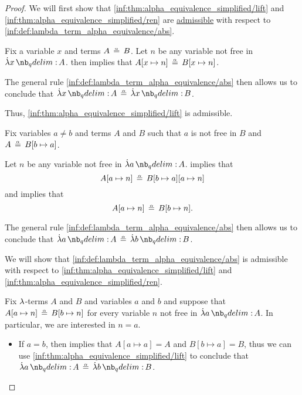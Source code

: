 \begin{proof}
  \SufficiencySubProof We will first show that \ref{inf:thm:alpha_equivalence_simplified/lift} and \ref{inf:thm:alpha_equivalence_simplified/ren} are \hyperref[con:inference_rule_admissibility]{admissible} with respect to \ref{inf:def:lambda_term_alpha_equivalence/abs}.

   Fix a variable \( x \) and terms \( A \aequiv B \). Let \( n \) be any variable not free in \( \qabs x A \).  then implies that \( A[x \mapsto n] \aequiv B[x \mapsto n] \).

  The general rule \ref{inf:def:lambda_term_alpha_equivalence/abs} then allows us to conclude that \( \qabs x A \aequiv \qabs x B \).

  Thus, \ref{inf:thm:alpha_equivalence_simplified/lift} is admissible.

   Fix variables \( a \neq b \) and terms \( A \) and \( B \) such that \( a \) is not free in \( B \) and \( A \aequiv B[b \mapsto a] \).

  Let \( n \) be any variable not free in \( \qabs a A \).  implies that
  \begin{equation*}
    A[a \mapsto n] \aequiv B[b \mapsto a][a \mapsto n]
  \end{equation*}
  and  implies that
  \begin{equation*}
    A[a \mapsto n] \aequiv B[b \mapsto n].
  \end{equation*}

  The general rule \ref{inf:def:lambda_term_alpha_equivalence/abs} then allows us to conclude that \( \qabs a A \aequiv \qabs b B \).

  \NecessitySubProof We will show that \ref{inf:def:lambda_term_alpha_equivalence/abs} is admissible with respect to \ref{inf:thm:alpha_equivalence_simplified/lift} and \ref{inf:thm:alpha_equivalence_simplified/ren}.

  Fix \( {\mathrm \lambda} \)-terms \( A \) and \( B \) and variables \( a \) and \( b \) and suppose that \( A[a \mapsto n] \aequiv B[b \mapsto n] \) for every variable \( n \) not free in \( \qabs a A \). In particular, we are interested in \( n = a \).

  \begin{itemize}
    \item If \( a = b \), then  implies that \( A[a \mapsto a] = A \) and \( B[b \mapsto a] = B \), thus we can use \ref{inf:thm:alpha_equivalence_simplified/lift} to conclude that \( \qabs a A \aequiv \qabs b B \).


\end{itemize}
\end{proof}
